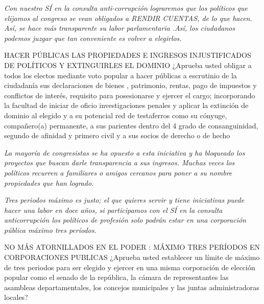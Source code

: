 \documentclass[twoside]{article}
\begin{document}
\begin{enumerate}
\begin{minipage}{0.55\linewidth}
\end{minipage}\hfill
\begin{minipage}{0.4\linewidth}
  \begin{shaded}
    \emph{Con nuestro SÍ en la consulta anti-corrupción lograremos que los políticos que elijamos al congreso se vean obligados a RENDIR CUENTAS, de lo que hacen. Así, se hace más transparente su labor parlamentaria .Así, los ciudadanos podemos juzgar que tan conveniente es volver a elegirlos.}
  \end{shaded}
\end{minipage}
\begin{minipage}{0.6\linewidth}
\item HACER PÚBLICAS LAS PROPIEDADES E INGRESOS INJUSTIFICADOS DE POLÍTICOS Y EXTINGUIRLES EL DOMINIO ¿Aprueba usted obligar a todos  los electos mediante voto popular a hacer públicas a escrutinio de la ciudadanía sus declaraciones de bienes ,  patrimonio, rentas, pago de impuestos y conflictos de interés, requisito para posesionarse y ejercer el cargo; incorporando la facultad  de iniciar de oficio investigaciones penales y aplicar la extinción de dominio al elegido y a su potencial red de testaferros como su cónyuge, compañero(a) permanente, a sus parientes dentro del 4 grado de consanguinidad, segundo de afinidad y primero civil y a sus socios de derecho o de hecho
\end{minipage}\hfill
\begin{minipage}{0.35\linewidth}
  \begin{shaded}
  \emph{La mayoría de congresistas se ha opuesto a esta iniciativa y ha bloqueado los proyectos que buscan darle transparencia a sus ingresos.
Muchas veces los políticos recurren a familiares o amigos cercanos  para poner a su nombre propiedades que han logrado.}
\end{shaded}
\end{minipage}
\begin{minipage}{0.4\linewidth}
  \begin{shaded}
    \emph{Tres periodos máximo es justo; el que quieres servir y tiene iniciativas puede hacer una labor en doce años, si participamos con el SÍ en la consulta anticorrupción los políticos de profesión solo podrán estar en una corporación pública máximo tres períodos. }
  \end{shaded}
\end{minipage}\hfill
\begin{minipage}{0.55\linewidth}
\item NO MÁS ATORNILLADOS EN EL PODER : MÁXIMO TRES PERÍODOS EN CORPORACIONES PUBLICAS ¿Aprueba usted establecer un límite de máximo de tres periodos para ser elegido y ejercer en una misma corporación de elección popular como el senado de la república, la cámara de representantes las asambleas departamentales, los concejos municipales y las juntas administradoras locales?
\end{minipage}
\end{enumerate}
\end{document}
